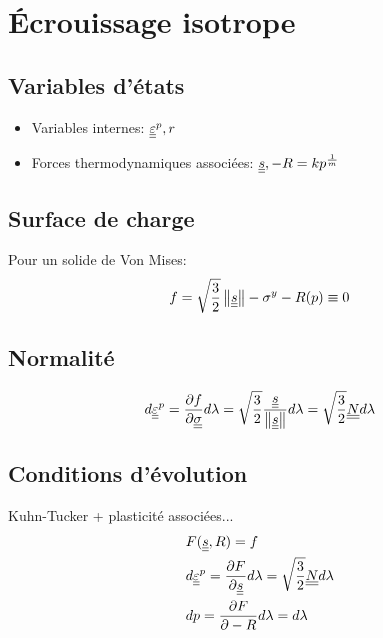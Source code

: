 \documentclass[11pt]{article}
\begin{document}
\section{{\'E}crouissage isotrope}
\label{sec:ecrouissage-isotrope}

\subsection{Variables d'{\'e}tats}
\label{sec:description}

\begin{itemize}
\item Variables internes: ${\underline{\underline{\varepsilon}}}^p, r$
\item Forces thermodynamiques associées: ${\underline{\underline{s}}}, -R = k p^{\frac{1}{m}}$
\end{itemize}

\subsection{Surface de charge}
\label{sec:surface-de-charge}

Pour un solide de Von Mises:
\begin{equation}
  \label{eq:isotropic_hardening_yield_surface}
  f = \sqrt{\frac{3}{2}}\left\Vert{\underline{\underline{s}}}\right\Vert - \sigma^y - R(p) \equiv 0
\end{equation}

\subsection{Normalit{\'e}}
\label{sec:normalite}

\begin{equation}
  d{\underline{\underline{\varepsilon}}}^p = \frac{\partial f}{\partial {\underline{\underline{\sigma}}}} d\lambda =\sqrt{\frac{3}{2}}\frac{{\underline{\underline{s}}}}{\left\Vert{\underline{\underline{s}}}\right\Vert} d\lambda= \sqrt{\frac{3}{2}}{\underline{\underline{N}}} d\lambda
\end{equation}

\subsection{Conditions d'évolution}

Kuhn-Tucker + plasticité associées...
\begin{align}
  & F({\underline{\underline{s}}},R) = f \\
  &d{\underline{\underline{\varepsilon}}}^p = \frac{\partial F}{\partial {\underline{\underline{s}}}} d\lambda =\sqrt{\frac{3}{2}} {\underline{\underline{N}}} d\lambda\\
  & dp = \frac{\partial F}{\partial -R} d\lambda = d\lambda
\end{align}
\end{document}
